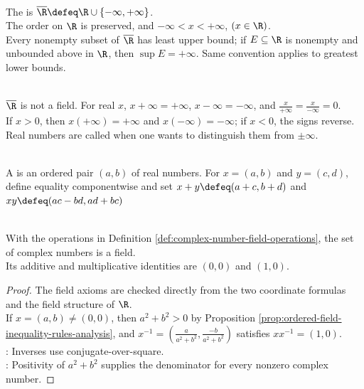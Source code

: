 \begin{definition} \label{def:extended-real-number-system} \\
The  is $\overline{\R}\defeq\R\cup\{-\infty,+\infty\}$.\\
The order on $\R$ is preserved, and $-\infty<x<+\infty$, $(x\in\R)$.\\
Every nonempty subset of $\overline{\R}$ has least upper bound; if $E\subseteq\R$ is nonempty and unbounded above in $\R$, then $\sup E=+\infty$. Same convention applies to greatest lower bounds.
\end{definition}

\begin{remark} \label{rem:extended-real-arithmetic-conventions} \\
$\overline{\R}$ is not a field. For real $x$, $x+\infty=+\infty$, $x-\infty=-\infty$, and $\frac{x}{+\infty}=\frac{x}{-\infty}=0$.\\
If $x>0$, then $x(+\infty)=+\infty$ and $x(-\infty)=-\infty$; if $x<0$, the signs reverse.\\
Real numbers are called  when one wants to distinguish them from $\pm\infty$.
\end{remark}

\begin{definition} \label{def:complex-number-field-operations} \\
A  is an ordered pair $(a,b)$ of real numbers. For $x=(a,b)$ and $y=(c,d)$, define equality componentwise and set $x+y\defeq(a+c,b+d)$ and $xy\defeq(ac-bd,ad+bc)$
\end{definition}

\begin{theorem} \label{thm:complex-numbers-form-field} \\
With the operations in Definition \ref{def:complex-number-field-operations}, the set of complex numbers is a field.\\
Its additive and multiplicative identities are $(0,0)$ and $(1,0)$.
\begin{proof}
The field axioms are checked directly from the two coordinate formulas and the field structure of $\R$.\\
If $x=(a,b)\neq(0,0)$, then $a^2+b^2>0$ by Proposition \ref{prop:ordered-field-inequality-rules-analysis}, and $x^{-1}=\left(\frac{a}{a^2+b^2},\frac{-b}{a^2+b^2}\right)$ satisfies $xx^{-1}=(1,0)$.\\
: Inverses use conjugate-over-square.\\
: Positivity of $a^2+b^2$ supplies the denominator for every nonzero complex number.
\end{proof}
\end{theorem}

